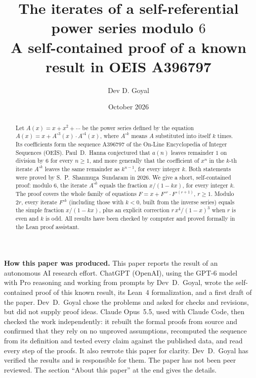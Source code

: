 \documentclass[11pt,a4paper]{article}
\title{The iterates of a self-referential power series modulo $6$\\[6pt]\large A self-contained proof of a known result in OEIS A396797}
\author{Dev D. Goyal}
\date{October 2026}
\theoremstyle{definition}
\theoremstyle{remark}
\begin{document}
\maketitle
\begin{abstract}
Let $A(x)=x+x^2+\cdots$ be the power series defined by the equation
$A(x)=x+A^{\circ3}(x)\cdot A^{\circ4}(x)$, where $A^{\circ k}$ means $A$ substituted into
itself $k$ times. Its coefficients form the sequence A396797 of the On-Line Encyclopedia of Integer Sequences
(OEIS). Paul~D.~Hanna conjectured that $a(n)$ leaves remainder $1$ on division by $6$ for every $n\ge1$, and more generally that
the coefficient of $x^n$ in the $k$-th iterate $A^{\circ k}$ leaves the same remainder as $k^{n-1}$, for every integer
$k$. Both statements were proved by S.~P.~Shanmuga~Sundaram in 2026. We give a short, self-contained proof:
modulo $6$, the iterate $A^{\circ k}$ equals the fraction $x/(1-kx)$, for every integer $k$. The proof covers the whole family of
equations $F=x+F^{\circ r}\cdot F^{\circ(r+1)}$, $r\ge1$. Modulo $2r$, every iterate $F^{\circ k}$ (including those
with $k<0$, built from the inverse series) equals the simple fraction $x/(1-kx)$, plus an explicit correction
$r\,x^4/(1-x)^3$ when $r$ is even and $k$ is odd. All results have been checked by computer and proved formally in the
Lean proof assistant.
\end{abstract}
\begin{center}\begin{minipage}{0.88\linewidth}\small
\textbf{How this paper was produced.} This paper reports the result of an autonomous AI research effort.
ChatGPT (OpenAI), using the GPT-6 model with Pro reasoning and working from prompts by Dev~D.~Goyal, wrote the self-contained proof of this known result, its Lean~4 formalization, and a first draft of the paper.
Dev~D.~Goyal chose the problems and asked for checks and revisions, but did not supply proof ideas.
Claude Opus~5.5, used with Claude Code, then checked the work independently: it rebuilt the formal proofs from
source and confirmed that they rely on no unproved assumptions, recomputed the sequence from its definition and tested
every claim against the published data, and read every step of the proofs. It also rewrote this paper for clarity.
Dev~D.~Goyal has verified the results and is responsible for them. The paper has not been peer reviewed.
The section ``About this paper'' at the end gives the details.
\end{minipage}\end{center}
\end{document}
